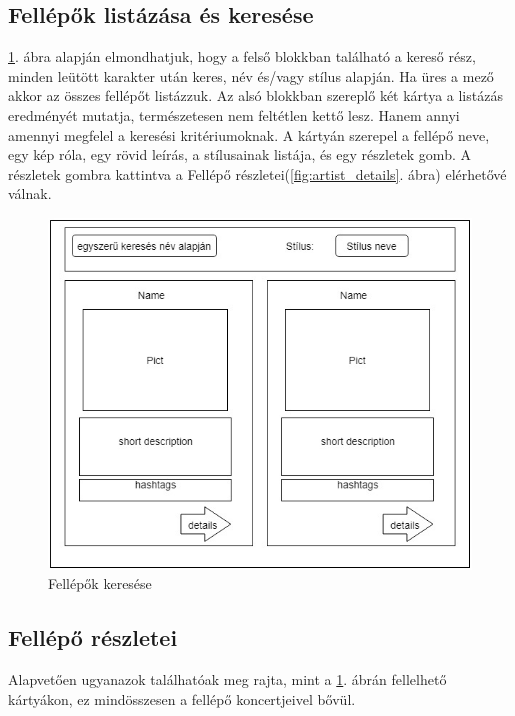 \subsection{Fellépők listázása és keresése}
\ref{fig:artist_search}. ábra alapján elmondhatjuk, hogy a felső blokkban található a kereső rész, minden leütött karakter után keres, név és/vagy stílus alapján. Ha üres a mező akkor az összes fellépőt listázzuk. Az alsó blokkban szereplő két kártya a listázás eredményét mutatja, természetesen nem feltétlen kettő lesz. Hanem annyi amennyi megfelel a keresési kritériumoknak. A kártyán szerepel a fellépő neve, egy kép róla, egy rövid leírás, a stílusainak listája, és egy részletek gomb. A részletek gombra kattintva a Fellépő részletei(\ref{fig:artist_details}. ábra) elérhetővé válnak.

\begin{figure}
\centering
\includegraphics[scale=0.5]{kepek/artist_search.jpg}
\caption{Fellépők keresése}
\label{fig:artist_search}
\end{figure}

\subsection{Fellépő részletei}
Alapvetően ugyanazok találhatóak meg rajta, mint a \ref{fig:artist_search}. ábrán fellelhető kártyákon, ez mindösszesen a fellépő koncertjeivel bővül.

